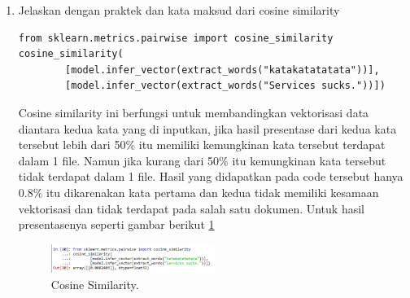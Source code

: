 \begin{enumerate}
\item Jelaskan dengan praktek dan kata maksud dari cosine similarity
\begin{verbatim}
from sklearn.metrics.pairwise import cosine_similarity
cosine_similarity(
        [model.infer_vector(extract_words("katakatatatata"))],
        [model.infer_vector(extract_words("Services sucks."))])
\end{verbatim}
Cosine similarity ini berfungsi untuk membandingkan vektorisasi data diantara kedua kata yang di inputkan, jika hasil presentase dari kedua kata tersebut lebih dari 50\% itu memiliki kemungkinan kata tersebut terdapat dalam 1 file. Namun jika kurang dari 50\% itu kemungkinan kata tersebut tidak terdapat dalam 1 file. Hasil yang didapatkan pada code tersebut hanya 0.8\% itu dikarenakan kata pertama dan kedua tidak memiliki kesamaan vektorisasi dan tidak terdapat pada salah satu dokumen. Untuk hasil presentasenya seperti gambar berikut \ref{sim15}
		\begin{figure}[!htbp]
		\centerline{\includegraphics[width=0.5\textwidth]{figures/im/sim15.png}}
		\caption{Cosine Similarity.}
		\label{sim15}
		\end{figure}

\end{enumerate}